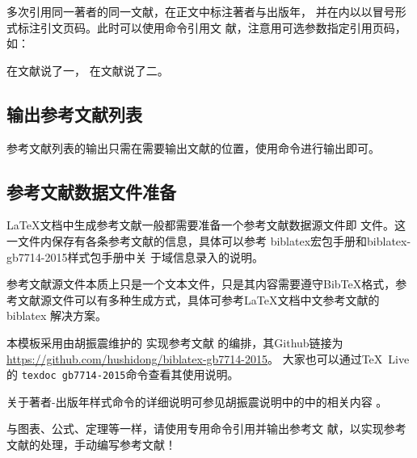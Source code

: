 多次引用同一著者的同一文献，在正文中标注著者与出版年，
并在\qtmark{()}内以以冒号形式标注引文页码。此时可以使用命令引用文
献，注意用可选参数指定引用页码，如：

在文献\parencite[20-22]{程根伟1999-32-36}说了一， 在文献\parencite[55-60]{程根伟1999-32-36}说了二。%

\subsection{输出参考文献列表}

参考文献列表的输出只需在需要输出文献的位置，使用命令进行输出即可。

\subsection{参考文献数据文件准备}

\LaTeX 文档中生成参考文献一般都需要准备一个参考文献数据源文件即
文件。这一文件内保存有各条参考文献的信息，具体可以参考
biblatex宏包手册和biblatex-gb7714-2015样式包手册\cite{胡振震2019}中关
于域信息录入的说明。

参考文献源文件本质上只是一个文本文件，只是其内容需要遵守BibTeX格式，参
考文献源文件可以有多种生成方式，具体可参考\LaTeX{}文档中文参考文献的
biblatex 解决方案\parencite[2.2节]{胡振震2016}。


本模板采用由胡振震维护的
实现参考文献
的编排\cite{胡振震2019}，其Github链接为
\url{https://github.com/hushidong/biblatex-gb7714-2015}。
大家也可以通过\TeX~Live的 \verb|texdoc gb7714-2015|命令查看其使用说明。

关于著者-出版年样式命令的详细说明可参见胡振震说明中的中的相关内容
\parencite[2.2、2.3节]{胡振震2016}。

与图表、公式、定理等一样，请使用专用命令引用并输出参考文
献，以实现参考文献的处理，手动编写参考文献！


